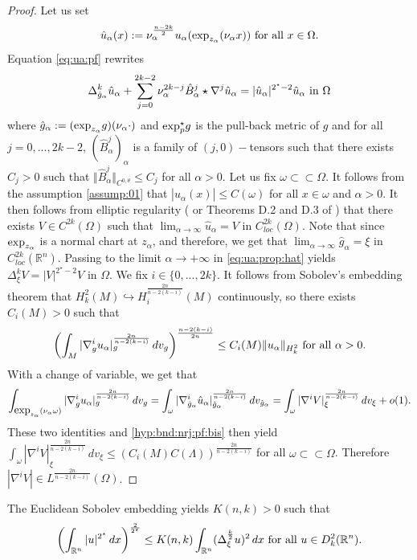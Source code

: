 \documentclass[reqno]{amsart}
\def \rn {\mathbb{R}^n}
\def \crit {2^\star}
\def \ua {u_\alpha}
\def \na {\nu_\alpha}
\def \za {z_\alpha}
\begin{document}
\begin{proof} Let us set
$$\hat{u}_\alpha(x):=\na^{\frac{n-2k}{2}}\ua(\hbox{exp}_{z_\alpha}(\na x))\hbox{ for all }x\in \Omega.$$
Equation \eqref{eq:ua:pf} rewrites
\begin{equation}\label{eq:ua:prop:hat}
\Delta_{\hat{g}_\alpha}^k\hat{u}_\alpha+\sum_{j=0}^{2k-2}\na^{2k-j}\hat{B}_\alpha^j\star\nabla^j\hat{u}_\alpha=|\hat{u}_\alpha|^{\crit-2 }\hat{u}_\alpha\hbox{ in }\Omega
\end{equation}
where $\hat{g}_\alpha:=(\hbox{exp}_{z_\alpha}g)(\na\cdot)$  and  $\hbox{exp}_{p }^\star g$ is the pull-back metric of $g$ and for all $j=0,...,2k-2$, $(\hat{B}_\alpha^j)_\alpha$ is a family of $(j,0)-$tensors such that there exists $C_j>0$ such that $\Vert \hat{B}_\alpha^j\Vert_{C^{0,\theta}}\leq C_j$ for all $\alpha>0$. Let us fix $\omega\subset\subset \Omega$. It follows from the assumption \eqref{assump:01} that $|\hat{u}_\alpha(x)|\leq C(\omega)$ for all $x\in\omega$ and $\alpha>0$. It then follows from elliptic regularity (\cite{ADN} or Theorems D.2 and D.3 of \cite{robert:gjms}) that there exists $V\in C^{2k}(\Omega)$ such that $\lim_{\alpha\to \infty}\hat{u}_\alpha=V$ in $C^{2k}_{loc}(\Omega)$. Note that since $\hbox{exp}_{z_\alpha}$ is a normal chart at $z_\alpha$, and therefore, we get that $\lim_{\alpha\to\infty}\hat{g}_\alpha=\xi$ in $C^{2k}_{loc}(\rn)$. Passing to the limit $\alpha\to +\infty$ in \eqref{eq:ua:prop:hat} yields $\Delta^k_\xi V=|V|^{\crit-2}V$ in $\Omega$. We fix $i\in \{0,...,2k\}$. It follows from Sobolev's embedding theorem that $H_{k}^2(M)\hookrightarrow H_i^{\frac{2n}{n-2(k-i)}}(M)$ continuously, so there exists $C_i(M)>0$ such that  
$$\left(\int_M |\nabla^i_g \ua|_g^{\frac{2n}{n-2(k-i)}}\, dv_g\right)^{\frac{n-2(k-i)}{2n}}\leq C_i(M)\Vert \ua\Vert_{H_k^2}\hbox{ for all }\alpha>0.$$
With a change of variable, we get that 
$$\int_{\hbox{exp}_{\za}(\na \omega)}|\nabla^i_g\ua|_g^{\frac{2n}{n-2(k-i)}}\, dv_g= \int_{\omega}|\nabla^i_{\hat{g}_\alpha}\hat{u}_\alpha|_{\hat{g}_\alpha}^{\frac{2n}{n-2(k-i)}}\, dv_{\hat{g}_\alpha}= \int_{\omega}|\nabla^i V|_\xi^{\frac{2n}{n-2(k-i)}}\, dv_\xi+o(1).$$
These two identities and  \eqref{hyp:bnd:nrj:pf:bis} then yield $\int_{\omega}|\nabla^i V|_\xi^{\frac{2n}{n-2(k-i)}}\, dv_\xi\leq (C_i(M)C(\Lambda))^{\frac{2n}{n-2(k-i)}}$
for all $\omega\subset\subset \Omega$. Therefore $|\nabla^i V|\in L^{\frac{2n}{n-2(k-i)}}(\Omega)$.\end{proof}
The Euclidean Sobolev embedding yields $K(n,k)>0$ such that
\begin{equation*}\label{sobo:ineq:rn}
\left(\int_{\rn}|u|^{\crit}\, dx\right)^\frac{2}{\crit}\leq K(n,k)\int_{\rn}(\Delta_\xi^{\frac{k}{2}}u)^2\, dx\hbox{ for all }u\in D_k^2(\rn).
\end{equation*}
\end{document}
